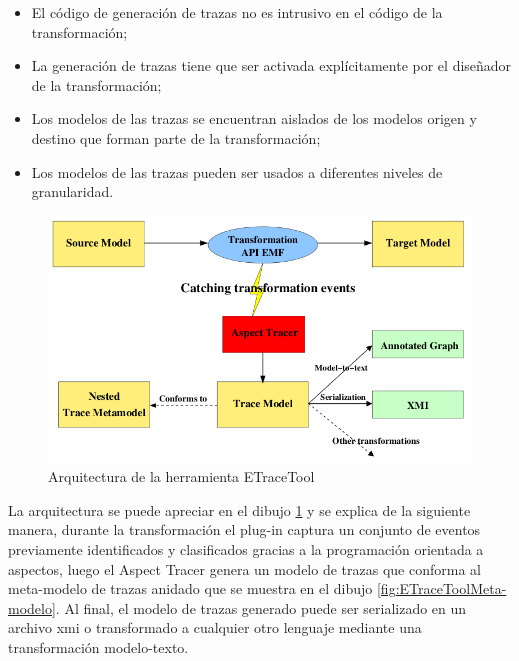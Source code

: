 \documentclass[a4paper,12pt,oneside,spanish]{book}
\begin{document}
\begin{itemize}
\item El código de generación de trazas no es intrusivo en el código de la transformación;
\item La generación de trazas tiene que ser activada explícitamente por el diseñador de la transformación;
\item Los modelos de las trazas se encuentran aislados de los modelos origen y destino que forman parte de la transformación;
\item Los modelos de las trazas pueden ser usados a diferentes niveles de granularidad.
\end{itemize}

\begin{figure}[hbtp]
\centering
\includegraphics[scale=0.5]{./img/ETraceTool_Arquitectura}
\caption{Arquitectura de la herramienta ETraceTool}
\label{fig:ArqETraceTool}
\end{figure}

La arquitectura se puede apreciar en el dibujo \ref{fig:ArqETraceTool} y se explica de la siguiente manera, durante la transformación el plug-in captura un conjunto de eventos previamente identificados y clasificados gracias a la programación orientada a aspectos, luego el Aspect Tracer genera un modelo de trazas que conforma al meta-modelo de trazas anidado que se muestra en el dibujo \ref{fig:ETraceToolMeta-modelo}. Al final, el modelo de trazas generado puede ser serializado en un archivo \gls{xmi} o transformado a cualquier otro lenguaje mediante una transformación modelo-texto.
\end{document}
